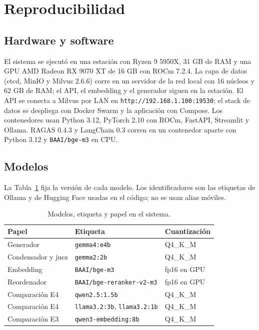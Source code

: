 \section{Reproducibilidad}
\label{sec:reproducibilidad}

\subsection{Hardware y software}

El sistema se ejecut\'o en una estaci\'on con Ryzen 9 5950X, 31 GB de RAM y una GPU AMD Radeon RX 9070 XT de 16 GB con ROCm 7.2.4. La capa de datos (etcd, MinIO y Milvus 2.6.6) corre en un servidor de la red local con 16 n\'ucleos y 62 GB de RAM; el API, el embedding y el generador siguen en la estaci\'on. El API se conecta a Milvus por LAN en \texttt{http://192.168.1.100:19530}; el stack de datos se despliega con Docker Swarm y la aplicaci\'on con Compose. Los contenedores usan Python 3.12, PyTorch 2.10 con ROCm, FastAPI, Streamlit y Ollama. RAGAS 0.4.3 y LangChain 0.3 corren en un contenedor aparte con Python 3.12 y \texttt{BAAI/bge-m3} en CPU.

\subsection{Modelos}

La Tabla~\ref{tab:modelos} fija la versi\'on de cada modelo. Los identificadores son las etiquetas de Ollama y de Hugging Face usadas en el c\'odigo; no se usan alias m\'oviles.

\begin{table}[t]
\centering
\footnotesize
\caption{Modelos, etiqueta y papel en el sistema.}
\label{tab:modelos}
\setlength{\tabcolsep}{3pt}
\begin{tabular}{lll}
\toprule
Papel & Etiqueta & Cuantizaci\'on \\
\midrule
Generador & \texttt{gemma4:e4b} & Q4\_K\_M \\
Condensador y juez & \texttt{gemma2:2b} & Q4\_K\_M \\
Embedding & \texttt{BAAI/bge-m3} & fp16 en GPU \\
Reordenador & \texttt{BAAI/bge-reranker-v2-m3} & fp16 en GPU \\
Comparaci\'on E4 & \texttt{qwen2.5:1.5b} & Q4\_K\_M \\
Comparaci\'on E4 & \texttt{llama3.2:3b}, \texttt{llama3.2:1b} & Q4\_K\_M \\
Comparaci\'on E3 & \texttt{qwen3-embedding:8b} & Q4\_K\_M \\
\bottomrule
\end{tabular}
\end{table}



